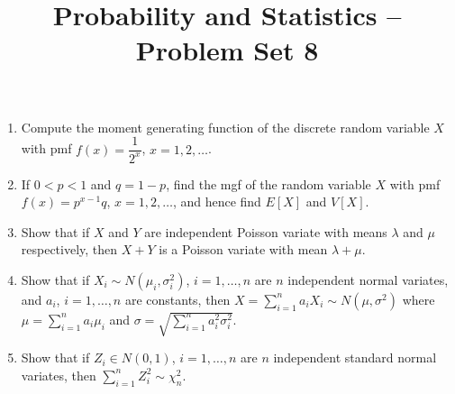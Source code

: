 \documentclass[svgnames]{amsart}
\title[]{Probability and Statistics -- Problem Set 8}
\begin{document}
\maketitle
\begin{enumerate}[leftmargin=*, itemsep=2mm]

\item Compute the moment generating function of the discrete random variable $X$ with pmf $f(x) = \dfrac{1}{2^x}$, $x = 1, 2, \ldots$.

\item If $0 < p < 1$ and $q = 1 - p$, find the mgf of the random variable $X$ with pmf $f(x) = p^{x - 1} q$, $x = 1, 2, \ldots$, and hence find $E[X]$ and $V[X]$.

\item Show that if $X$ and $Y$ are independent Poisson variate with means $\lambda$ and $\mu$ respectively, then $X + Y$ is a Poisson variate with mean $\lambda + \mu$.

\item Show that if $X_i \sim N(\mu_i, \sigma_i^2)$, $i = 1, \ldots, n$ are $n$ independent normal variates, and $a_i$, $i = 1, \ldots, n$ are constants, then $X = \sum_{i=1}^{n} a_i X_i \sim N(\mu, \sigma^2)$ where $\mu = \sum_{i = 1}^{n} a_i \mu_i$ and $\sigma = \sqrt{\sum_{i = 1}^n a_i^2 \sigma_i^2}$.

\item Show that if $Z_i \in N(0, 1)$, $i = 1, \ldots, n$ are $n$ independent standard normal variates, then $\sum_{i = 1}^n Z_i^2 \sim \chi^2_n$.

\end{enumerate}
\end{document}
